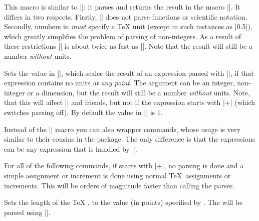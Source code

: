 \begin{command}{\pgfmathparse{}}
\begin{itemize}
\begin{codeexample}[post=\tt\footnotesize\pgfmathresult]
\end{codeexample}
\begin{codeexample}[post=\tt\footnotesize\pgfmathresult]
\end{codeexample}
  \end{itemize}
\end{command}

\begin{command}{\pgfmathqparse{}}
  This macro is similar to |\pgfmathparse|: it parses 
   and returns the result in the macro 
  |\pgfmathresult|. It differs in two respects. Firstly, 
  |\pgfmathqparse| does not parse functions or scientific
  notation. 
  Secondly, numbers in  \emph{must}
  specify a \TeX{} unit (except in such instances as |0.5\pgf@x|), 
  which greatly simplifies the problem of parsing 
  of non-integers. As a result of these restrictions |\pgfmathqparse| 
  is about twice as fast as |\pgfmathparse|. Note that the result 
  will still be a number \emph{without} units.	
\end{command}

\begin{command}{\pgfmathsetresultunitscale{}}
  Sets the value in |\pgfmathresultunitscale|, which scales the result
  of an expression parsed with |\pgfmathparse|, if that expression
  contains no units \emph{at any point}. The argument can be an integer,
  non-integer or a dimension, but the result will still be a number 
  \emph{without} units. Note, that this will affect |\pgfmathsetlength| 
  and friends, but not if the expression starts with |+| (which
  switches parsing off). By default the value in
  |\pgfmathresultunitscale| is 1. 
\end{command}

Instead of the |\pgfmathparse| macro you can also wrapper commands,
whose usage is very similar to their cousins in the \calcname{} 
package. The only difference is that the expressions can be any
expression that is handled by |\pgfmathparse|.

For all of the following commands, if  starts with
|+|, no parsing is done and a simple assignment or increment is done
using normal \TeX\ assignments or increments. This will be orders of
magnitude faster than calling the parser. 

\begin{command}{\pgfmathsetlength{}}
  Sets the length of the \TeX{} , to the value
  (in points) specified by . The 
  will be parsed using |\pgfmathparse|.
\end{command}

